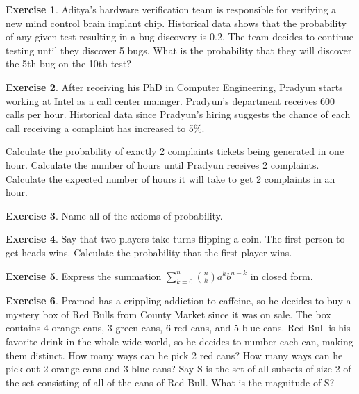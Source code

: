 \documentclass[12pt]{amsart}
\theoremstyle{definition}
\newtheorem{exercise}{Exercise}
\numberwithin{equation}{section}
\theoremstyle{plain}
\begin{document}
\begin{exercise}
    Aditya's hardware verification team is responsible for verifying a new mind control brain implant chip. Historical data shows that the probability of any given test resulting in a bug discovery is 0.2. The team decides to continue testing until they discover 5 bugs. What is the probability that they will discover the 5th bug on the 10th test?%
\end{exercise}

\begin{exercise}
    After receiving his PhD in Computer Engineering, Pradyun starts working at Intel as a call center manager. Pradyun's department receives 600 calls per hour. Historical data since Pradyun's hiring suggests the chance of each call receiving a complaint has increased to 5\%. 
    \begin{enumerate}
    \newline
    Calculate the probability of exactly 2 complaints tickets being generated in one hour. 
    \newline
    Calculate the number of hours until Pradyun receives 2 complaints.
    \newline
    Calculate the expected number of hours it will take to get 2 complaints in an hour.
    \end{enumerate}
\end{exercise}

\begin{exercise}
Name all of the axioms of probability.
\end{exercise}

\begin{exercise}
Say that two players take turns flipping a coin. The first person to get heads wins. Calculate the probability that the first player wins.
\end{exercise}

\begin{exercise}
Express the summation $\sum_{k=0}^{n}\binom{n}{k}a^kb^{n-k}$ in closed form.
\end{exercise}

\begin{exercise}
Pramod has a crippling addiction to caffeine, so he decides to buy a mystery box of Red Bulls from County Market since it was on sale. The box contains 4 orange cans, 3 green cans, 6 red cans, and 5 blue cans. Red Bull is his favorite drink in the whole wide world, so he decides to number each can, making them distinct. 
\newline
How many ways can he pick 2 red cans?
\newline
How many ways can he pick out 2 orange cans and 3 blue cans?
\newline
Say S is the set of all subsets of size 2 of the set consisting of all of the cans of Red Bull. What is the magnitude of S?
\end{exercise}
\end{document}
